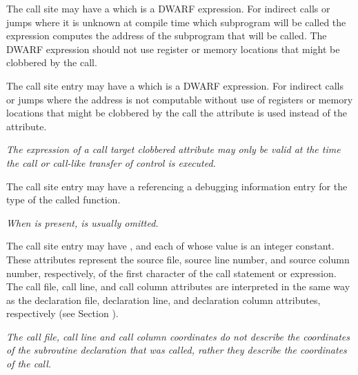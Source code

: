 The call site may have a 
\DWATcalltargetDEFN{}
 which is
a DWARF expression.  For indirect calls or jumps where it is unknown at
compile time which subprogram will be called the expression computes the
address of the subprogram that will be called.  The DWARF expression should
not use register or memory locations that might be clobbered by the call.

The call site entry may have a 
\DWATcalltargetclobberedDEFN{}
which is a DWARF expression.  For indirect calls or jumps where the
address is not computable without use of registers or memory locations that
might be clobbered by the call the \DWATcalltargetclobberedNAME{}
attribute is used instead of the \DWATcalltarget{} attribute.

\textit{The expression of a call target clobbered attribute may only be 
valid at the time the call or call-like transfer of control is executed.}

The call site entry may have a \DWATtypeDEFN{}
referencing a debugging information entry for the type of the called function.  

\textit{When \DWATcallorigin{} is present, \DWATtypeNAME{} is usually omitted.}

The call site entry may have 
\DWATcallfileDEFN{}, 
\DWATcalllineDEFN{} and 
\DWATcallcolumnDEFN{} 
each of whose value is an integer constant.
These attributes represent the source file, source line number, and source
column number, respectively, of the first character of the call statement or
expression.  The call file, call line, and call column attributes are
interpreted in the same way as the declaration file, declaration
line, and declaration column attributes, respectively 
(see Section ).

\textit{The call file, call line and call column coordinates do not describe the
coordinates of the subroutine declaration that was called, rather they describe
the coordinates of the call.}

